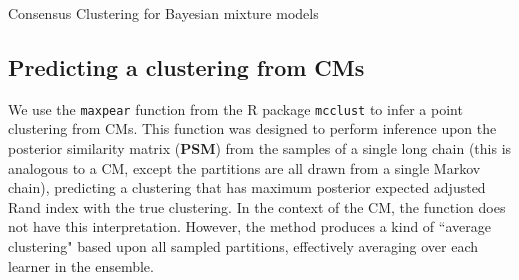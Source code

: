 \documentclass{bioinfo}
\begin{document}
\begin{methods}
\begin{algorithm} \label{algorithm:CCforBayesianMixtures}
	\caption{Consensus Clustering for Bayesian mixture models}
\end{algorithm}




\subsection{Predicting a clustering from CMs}
We use the \texttt{maxpear} function \citep{fritsch2009improved} from the R package \texttt{mcclust} \citep{fritsch2012mcclust} to infer a point clustering from CMs. This function was designed to perform inference upon the posterior similarity matrix (\textbf{PSM}) from the samples of a single long chain (this is analogous to a CM, except the partitions are all drawn from a single Markov chain), predicting a clustering that has maximum posterior expected adjusted Rand index \citep[\textbf{ARI},][]{hubert1985comparing} with the true clustering. In the context of the CM, the function does not have this interpretation. However, the method produces a kind of ``average clustering" based upon all sampled partitions, effectively averaging over each learner in the ensemble.


\end{methods}
\end{document}
